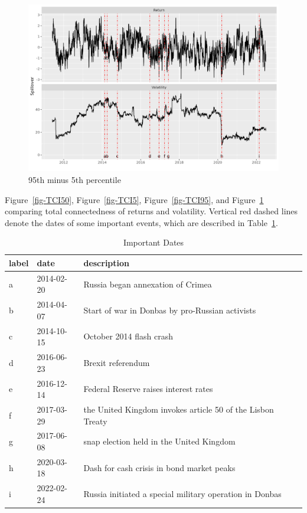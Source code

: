 \documentclass[
  letterpaper,
  DIV=11,
  numbers=noendperiod]{scrartcl}
\begin{document}
\begin{figure}[H]

{\centering \includegraphics{plots/fig-TCIrtd.png}

}

\caption{\label{fig-TCIrtd}95th minus 5th percentile}

\end{figure}

Figure~\ref{fig-TCI50}, Figure~\ref{fig-TCI5}, Figure~\ref{fig-TCI95},
and Figure~\ref{fig-TCIrtd} comparing total connectedness of returns and
volatility. Vertical red dashed lines denote the dates of some important
events, which are described in Table~\ref{tbl-dates}.

\hypertarget{tbl-dates}{}
\begin{table}[H]
\caption{\label{tbl-dates}Important Dates }\tabularnewline

\centering
\begin{tabular}[t]{lll}
\toprule
label & date & description\\
\midrule
a & 2014-02-20 & Russia began annexation of Crimea\\
b & 2014-04-07 & Start of war in Donbas by pro-Russian activists\\
c & 2014-10-15 & October 2014 flash crash\\
d & 2016-06-23 & Brexit referendum\\
e & 2016-12-14 & Federal Reserve raises interest rates\\
\addlinespace
f & 2017-03-29 & the United Kingdom invokes article 50 of the Lisbon Treaty\\
g & 2017-06-08 & snap election held in the United Kingdom\\
h & 2020-03-18 & Dash for cash crisis in bond market peaks\\
i & 2022-02-24 & Russia initiated a special military operation in Donbas\\
\bottomrule
\end{tabular}
\end{table}
\end{document}

